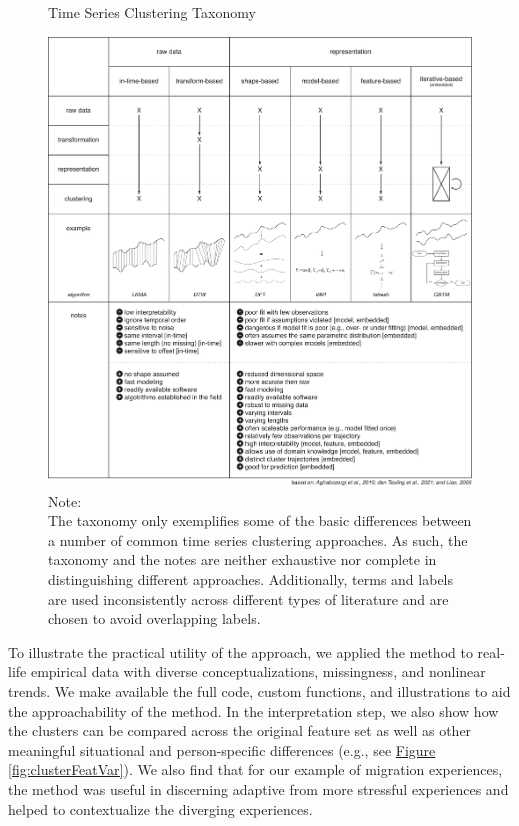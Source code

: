 \documentclass[man, 12pt, a4paper, mask, floatsintext]{apa7}
\theoremstyle{break}
\theoremstyle{plain}
\newcommand{\fgrref}[2][]{\hyperref[#2]{Figure \ref*{#2}#1}}
\begin{document}
\begin{figure}[!hbtp] %
  \caption{Time Series Clustering Taxonomy}
  \label{fig:tsClustTax}
  \centering\includegraphics[width=\textwidth]{figures/TS Cluster Flow/tsClustTax.pdf}
  \caption*{Note: \\
  The taxonomy only exemplifies some of the basic differences between a number of common time series clustering approaches. As such, the taxonomy and the notes are neither exhaustive nor complete in distinguishing different approaches. Additionally, terms and labels are used inconsistently across different types of literature and are chosen to avoid overlapping labels.}
\end{figure}

To illustrate the practical utility of the approach, we applied the method to real-life empirical data with diverse conceptualizations, missingness, and nonlinear trends. We make available the full code, custom functions, and illustrations to aid the approachability of the method. In the interpretation step, we also show how the clusters can be compared across the original feature set as well as other meaningful situational and person-specific differences (e.g., see \fgrref{fig:clusterFeatVar}). We also find that for our example of migration experiences, the method was useful in discerning adaptive from more stressful experiences and helped to contextualize the diverging experiences.
\end{document}
